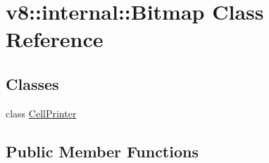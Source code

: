 \hypertarget{classv8_1_1internal_1_1_bitmap}{}\section{v8\+:\+:internal\+:\+:Bitmap Class Reference}
\label{classv8_1_1internal_1_1_bitmap}
\subsection*{Classes}
\begin{DoxyCompactItemize}
\item 
class \hyperlink{classv8_1_1internal_1_1_bitmap_1_1_cell_printer}{Cell\+Printer}
\end{DoxyCompactItemize}
\subsection*{Public Member Functions}
